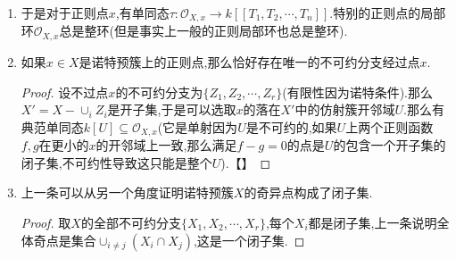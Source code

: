 \begin{enumerate}
\begin{proof}
		我们解释过局部参数系统是局部环极大理想的生成元集,于是$m_x^{k+1}$中的元可以表示为$m_x$系数的关于$u_1,u_2,\cdots,u_n$的$k$次齐次形式,于是有如下等式,其中$\mu\in m_x$,而$H_i$是次数为$i$的齐次形式.
		$$F_k(u_1,u_2,\cdots,u_n)=\mu u_n^k+H_1(u_1,u_2,\cdots,u_{n-1})u_n^{k-1}+\cdots+H_k(u_1,u_2,\cdots,u_{n-1})$$
		
		这两个式子做差,说明$(\alpha-\mu)u_n^k\in(u_1,u_2,\cdots,u_{n-1})$,但是这里$0\not=\alpha\in k$,导致$\alpha-\mu\not\in m_x$,于是$(\alpha-\mu)^{-1}\in\mathscr{O}_{X,x}$,导致$u_n^k\in(u_1,u_2,\cdots,u_{n-1})$,但是这不能成立,因为导致$V(u_1)\cap\cdots\cap V(u_{n-1})\subseteq V(u_n)$,导致$T_1\cap\cdots\cap T_{n-1}\subseteq T_n$,其中$T_i$是$x$在$V(u_i)$中的切空间,导致$T_1\cap T_2\cap\cdots\cap T_n=T_1\cap\cdots\cap T_{n-1}$,但是后者的维数$\ge1$,导致前者的维数$\ge1$,但是我们解释过此时前者的交是零.
	\end{proof}
    \item 于是对于正则点$x$,有单同态$\tau:\mathscr{O}_{X,x}\to k[[T_1,T_2,\cdots,T_n]]$.特别的正则点的局部环$\mathscr{O}_{X,x}$总是整环(但是事实上一般的正则局部环也总是整环).
    \item 如果$x\in X$是诺特预簇上的正则点,那么恰好存在唯一的不可约分支经过点$x$.
    \begin{proof}
    	
    	设不过点$x$的不可约分支为$\{Z_1,Z_2,\cdots,Z_r\}$(有限性因为诺特条件).那么$X'=X-\cup_iZ_i$是开子集,于是可以选取$x$的落在$X'$中的仿射簇开邻域$U$.那么有典范单同态$k[U]\subseteq\mathscr{O}_{X,x}$(它是单射因为$U$是不可约的,如果$U$上两个正则函数$f,g$在更小的$x$的开邻域上一致,那么满足$f-g=0$的点是$U$的包含一个开子集的闭子集,不可约性导致这只能是整个$U$).【】
    \end{proof}
    \item 上一条可以从另一个角度证明诺特预簇$X$的奇异点构成了闭子集.
    \begin{proof}
    	
    	取$X$的全部不可约分支$\{X_1,X_2,\cdots,X_r\}$,每个$X_i$都是闭子集,上一条说明全体奇点是集合$\cup_{i\not=j}(X_i\cap X_j)$,这是一个闭子集.
    \end{proof}
\end{enumerate}








